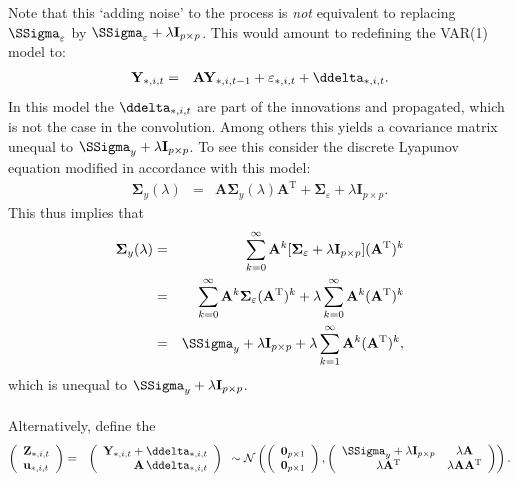 \documentclass[a4paper]{article}
\theoremstyle{myexamplestyle}
\begin{document}
Note that this `adding noise' to the process is {\it not} equivalent to replacing $\SSigma_{\varepsilon}$ by  $\SSigma_{\varepsilon} + \lambda \mathbf{I}_{p \times p}$. This would amount to redefining the VAR(1) model to:
\begin{eqnarray*}
\mathbf{Y}_{\ast, i, t} & = & \mathbf{A} \mathbf{Y}_{\ast, i, t-1} +
\varepsilon_{\ast, i, t} + \ddelta_{\ast, i, t}.
\end{eqnarray*}
In this model the $\ddelta_{\ast, i, t}$ are part of the innovations and propagated, which is not the case in the convolution. Among others this yields a covariance matrix unequal to $\SSigma_y + \lambda \mathbf{I}_{p \times p}$. To see this consider the discrete Lyapunov equation modified in accordance with this model:
\begin{eqnarray*}
\mathbf{\Sigma}_{y}(\lambda) & = & \mathbf{A} \mathbf{\Sigma}_{y} (\lambda) \mathbf{A}^{\mathrm{T}} + \mathbf{\Sigma}_{\varepsilon}  + \lambda \mathbf{I}_{p \times p}.
\end{eqnarray*}
This thus implies that
\begin{eqnarray*}
\mathbf{\Sigma}_{y}(\lambda) & = & \sum_{k=0}^{\infty} \mathbf{A}^k [ \mathbf{\Sigma}_{\varepsilon} + \lambda \mathbf{I}_{p \times p}
] (\mathbf{A}^{\mathrm{T}})^k
\\
& = & \sum_{k=0}^{\infty} \mathbf{A}^k \mathbf{\Sigma}_{\varepsilon} (\mathbf{A}^{\mathrm{T}})^k
 +
\lambda \sum_{k=0}^{\infty} \mathbf{A}^k (\mathbf{A}^{\mathrm{T}})^k
\\
& = & \SSigma_y + \lambda \mathbf{I}_{p \times p} + \lambda \sum_{k=1}^{\infty} \mathbf{A}^k (\mathbf{A}^{\mathrm{T}})^k,
\end{eqnarray*}
which is unequal to $\SSigma_y + \lambda \mathbf{I}_{p \times p}$.
\\
\\
Alternatively, define the
\begin{eqnarray*}
\left(
\begin{array}{l}
\mathbf{Z}_{\ast, i, t}
\\
\mathbf{u}_{\ast, i, t}
\end{array}
\right)
& = &
\left(
\begin{array}{r}
\mathbf{Y}_{\ast, i, t} + \ddelta_{\ast, i, t}
\\
\mathbf{A} \, \ddelta_{\ast, i, t}
\end{array}
\right)
\, \,\, \sim \mathcal{N}
\left(
\left(
\begin{array}{r}
\mathbf{0}_{p \times 1}
\\
\mathbf{0}_{p \times 1}
\end{array}
\right)
,
\left(
\begin{array}{cc}
\SSigma_y + \lambda \mathbf{I}_{p \times p}   & \lambda \mathbf{A}
\\
\lambda \mathbf{A}^{\mathrm{T}} &  \lambda \mathbf{A} \mathbf{A}^{\mathrm{T}}
\end{array}
\right)
\right).
\end{eqnarray*}
\end{document}
